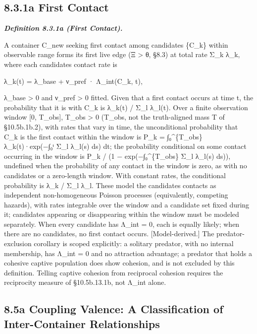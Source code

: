 \documentclass[
]{article}
\begin{document}
\hypertarget{a-first-contact}{%
\subsection{8.3.1a First Contact}\label{a-first-contact}}

\emph{\textbf{Definition 8.3.1a (First Contact).}}

A container C\_new seeking first contact among candidates \{C\_k\}
within observable range forms its first live edge (Ξ \textgreater{} θ,
§8.3) at total rate Σ\_k λ\_k, where each candidate\textquotesingle s
contact rate is

λ\_k(t) = λ\_base + ν\_pref · Λ\_int(C\_k, t),

λ\_base \textgreater{} 0 and ν\_pref \textgreater{} 0 fitted. Given that
a first contact occurs at time t, the probability that it is with C\_k
is λ\_k(t) / Σ\_l λ\_l(t). Over a finite observation window {[}0,
T\_obs{]}, T\_obs \textgreater{} 0 (T\_obs, not the truth-aligned mass T
of §10.5b.1b.2), with rates that vary in time, the unconditional
probability that C\_k is the first contact within the window is P\_k =
∫₀\^{}\{T\_obs\} λ\_k(t)·exp(−∫₀ᵗ Σ\_l λ\_l(s) ds) dt; the probability
conditional on some contact occurring in the window is P\_k / (1 −
exp(−∫₀\^{}\{T\_obs\} Σ\_l λ\_l(s) ds)), undefined when the probability
of any contact in the window is zero, as with no candidates or a
zero-length window. With constant rates, the conditional probability is
λ\_k / Σ\_l λ\_l. These model the candidates\textquotesingle{} contacts
as independent non-homogeneous Poisson processes (equivalently,
competing hazards), with rates integrable over the window and a
candidate set fixed during it; candidates appearing or disappearing
within the window must be modeled separately. When every candidate has
Λ\_int = 0, each is equally likely; when there are no candidates, no
first contact occurs. {[}Model-derived.{]} The predator-exclusion
corollary is scoped explicitly: a solitary predator, with no internal
membership, has Λ\_int = 0 and no attraction advantage; a predator that
holds a cohesive captive population does show cohesion, and is not
excluded by this definition. Telling captive cohesion from reciprocal
cohesion requires the reciprocity measure of §10.5b.13.1b, not Λ\_int
alone.

\hypertarget{a-coupling-valence-a-classification-of-inter-container-relationships}{%
\subsection{8.5a Coupling Valence: A Classification of Inter-Container
Relationships}\label{a-coupling-valence-a-classification-of-inter-container-relationships}}
\end{document}
